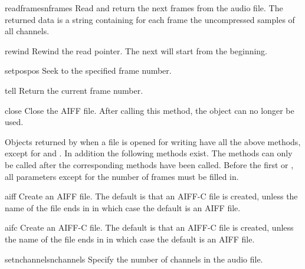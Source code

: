 \begin{methoddesc}[aifc]{readframes}{nframes}
Read and return the next  frames from the audio file.  The
returned data is a string containing for each frame the uncompressed
samples of all channels.
\end{methoddesc}

\begin{methoddesc}[aifc]{rewind}{}
Rewind the read pointer.  The next  will start from
the beginning.
\end{methoddesc}

\begin{methoddesc}[aifc]{setpos}{pos}
Seek to the specified frame number.
\end{methoddesc}

\begin{methoddesc}[aifc]{tell}{}
Return the current frame number.
\end{methoddesc}

\begin{methoddesc}[aifc]{close}{}
Close the AIFF file.  After calling this method, the object can no
longer be used.
\end{methoddesc}

Objects returned by  when a file is opened for
writing have all the above methods, except for  and
.  In addition the following methods exist.  The
 methods can only be called after the corresponding
 methods have been called.  Before the first
 or , all parameters
except for the number of frames must be filled in.

\begin{methoddesc}[aifc]{aiff}{}
Create an AIFF file.  The default is that an AIFF-C file is created,
unless the name of the file ends in  in which case the
default is an AIFF file.
\end{methoddesc}

\begin{methoddesc}[aifc]{aifc}{}
Create an AIFF-C file.  The default is that an AIFF-C file is created,
unless the name of the file ends in  in which case the
default is an AIFF file.
\end{methoddesc}

\begin{methoddesc}[aifc]{setnchannels}{nchannels}
Specify the number of channels in the audio file.
\end{methoddesc}

